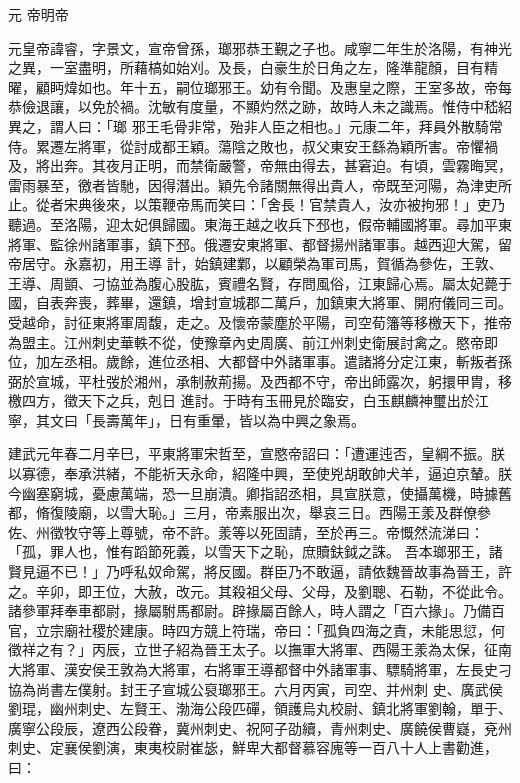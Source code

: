 
\begin{pinyinscope}

 元
 帝明帝



 元皇帝諱睿，字景文，宣帝曾孫，瑯邪恭王覲之子也。咸寧二年生於洛陽，有神光之異，一室盡明，所藉槁如始刈。及長，白豪生於日角之左，隆準龍顏，目有精曜，顧眄煒如也。年十五，嗣位瑯邪王。幼有令聞。及惠皇之際，王室多故，帝每恭儉退讓，以免於禍。沈敏有度量，不顯灼然之跡，故時人未之識焉。惟侍中嵇紹異之，謂人曰：「瑯
 邪王毛骨非常，殆非人臣之相也。」元康二年，拜員外散騎常侍。累遷左將軍，從討成都王穎。蕩陰之敗也，叔父東安王繇為穎所害。帝懼禍及，將出奔。其夜月正明，而禁衛嚴警，帝無由得去，甚窘迫。有頃，雲霧晦冥，雷雨暴至，徼者皆馳，因得潛出。穎先令諸關無得出貴人，帝既至河陽，為津吏所止。從者宋典後來，以策鞭帝馬而笑曰：「舍長！官禁貴人，汝亦被拘邪！」吏乃聽過。至洛陽，迎太妃俱歸國。東海王越之收兵下邳也，假帝輔國將軍。尋加平東將軍、監徐州諸軍事，鎮下邳。俄遷安東將軍、都督揚州諸軍事。越西迎大駕，留帝居守。永嘉初，用王導
 計，始鎮建鄴，以顧榮為軍司馬，賀循為參佐，王敦、王導、周顗、刁協並為腹心股肱，賓禮名賢，存問風俗，江東歸心焉。屬太妃薨于國，自表奔喪，葬畢，還鎮，增封宣城郡二萬戶，加鎮東大將軍、開府儀同三司。受越命，討征東將軍周馥，走之。及懷帝蒙塵於平陽，司空荀籓等移檄天下，推帝為盟主。江州刺史華軼不從，使豫章內史周廣、前江州刺史衛展討禽之。愍帝即位，加左丞相。歲餘，進位丞相、大都督中外諸軍事。遣諸將分定江東，斬叛者孫弼於宣城，平杜弢於湘州，承制赦荊揚。及西都不守，帝出師露次，躬擐甲胄，移檄四方，徵天下之兵，剋日
 進討。于時有玉冊見於臨安，白玉麒麟神璽出於江寧，其文曰「長壽萬年」，日有重暈，皆以為中興之象焉。



 建武元年春二月辛巳，平東將軍宋哲至，宣愍帝詔曰：「遭運迍否，皇綱不振。朕以寡德，奉承洪緒，不能祈天永命，紹隆中興，至使兇胡敢帥犬羊，逼迫京輦。朕今幽塞窮城，憂慮萬端，恐一旦崩潰。卿指詔丞相，具宣朕意，使攝萬機，時據舊都，脩復陵廟，以雪大恥。」三月，帝素服出次，舉哀三日。西陽王羕及群僚參佐、州徵牧守等上尊號，帝不許。羕等以死固請，至於再三。帝慨然流涕曰：「孤，罪人也，惟有蹈節死義，以雪天下之恥，庶贖鈇鉞之誅。
 吾本瑯邪王，諸賢見逼不已！」乃呼私奴命駕，將反國。群臣乃不敢逼，請依魏晉故事為晉王，許之。辛卯，即王位，大赦，改元。其殺祖父母、父母，及劉聰、石勒，不從此令。諸參軍拜奉車都尉，掾屬駙馬都尉。辟掾屬百餘人，時人謂之「百六掾」。乃備百官，立宗廟社稷於建康。時四方競上符瑞，帝曰：「孤負四海之責，未能思愆，何徵祥之有？」丙辰，立世子紹為晉王太子。以撫軍大將軍、西陽王羕為太保，征南大將軍、漢安侯王敦為大將軍，右將軍王導都督中外諸軍事、驃騎將軍，左長史刁協為尚書左僕射。封王子宣城公裒瑯邪王。六月丙寅，司空、并州刺
 史、廣武侯劉琨，幽州刺史、左賢王、渤海公段匹磾，領護烏丸校尉、鎮北將軍劉翰，單于、廣寧公段辰，遼西公段眷，冀州刺史、祝阿子劭續，青州刺史、廣饒侯曹嶷，兗州刺史、定襄侯劉演，東夷校尉崔毖，鮮卑大都督慕容廆等一百八十人上書勸進，曰：




\end{pinyinscope}

